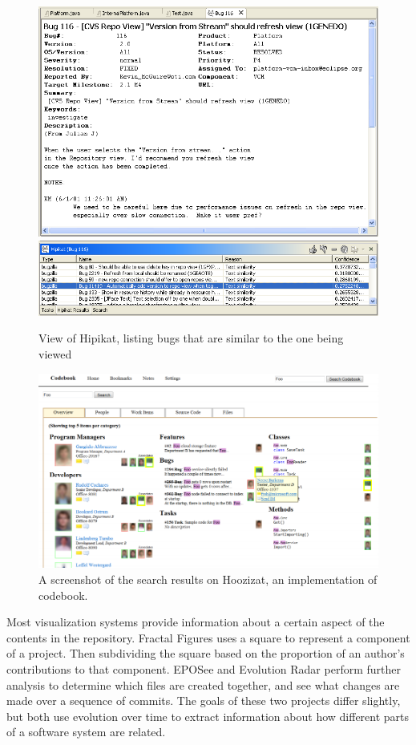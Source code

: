 \begin{figure}[htpb]
  \centering
  \includegraphics[width=0.9\linewidth]{Figures/introduction/hipikat_bug.png}
  \includegraphics[width=0.9\linewidth]{Figures/introduction/hipikat.png}
  \caption{View of Hipikat, listing bugs that are similar to the one
  being viewed}
  \label{fig:hipikat}
\end{figure}

\begin{figure}[htpb]
  \centering
  \includegraphics[width=0.8\linewidth]{Figures/introduction/codebook.png}
  \caption{A screenshot of the search results on Hoozizat, an
    implementation of codebook.}
  \label{fig:codebook}
\end{figure}

Most visualization systems provide information about a certain aspect of
the contents in the repository. Fractal Figures\cite{Ambros2005} uses a
square to represent a component of a project. Then subdividing the
square based on the proportion of an author's contributions to that
component. EPOSee\cite{Burch2005} and Evolution Radar\cite{Ambros2009}
perform further analysis to determine which files are created together,
and see what changes are made over a sequence of commits. The goals of
these two projects differ slightly, but both use evolution over time to
extract information about how different parts of a software system are
related.

